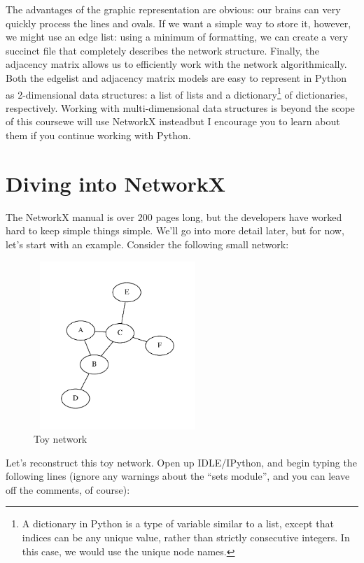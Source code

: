 \documentclass{article}
\begin{document}
\DefineShortVerb{\|}
The advantages of the graphic representation are obvious: our brains can very quickly process the lines and ovals.  
If we want a simple way to store it, however, we might use an edge list: using a minimum of formatting, we can create 
a very succinct file that completely describes the network structure.  Finally, the adjacency matrix allows us to efficiently 
work with the network algorithmically.  Both the edgelist and adjacency matrix models are easy to represent in Python as 2-dimensional 
data structures: a list of lists and a dictionary\footnote{A dictionary in Python is a type of variable similar to a list, except that 
indices can be any unique value, rather than strictly consecutive integers.  In this case, we would use the unique node names.} of 
dictionaries, respectively.  Working with multi-dimensional data structures is beyond the scope of this course\textemdash we will use NetworkX
instead\textemdash but I encourage you to learn about them if you continue working with Python.


\section{Diving into NetworkX}
\label{diving}
The NetworkX manual is over 200 pages long, but the developers have worked hard to keep simple things simple.  We'll go into more detail later,
but for now, let's start with an example.  Consider the following small network:

\begin{figure}[h]
\label{toy_net}
\begin{center}
\includegraphics[trim = .4in .4in .4in .4in, clip, width=2.5in, height=2.5in]{7_sampleA-F.pdf}
\caption{Toy network}
\end{center}
\end{figure}

Let's reconstruct this toy network.  Open up IDLE/IPython, and begin typing the following lines (ignore any warnings about the ``sets module'', and you can leave off the comments, of course):
\end{document}
